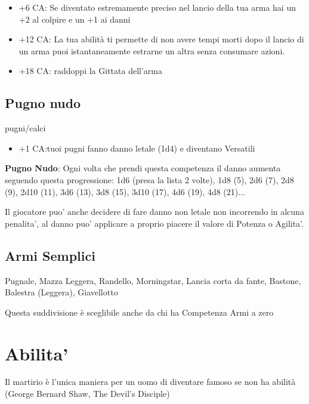 \documentclass[a4paper,11pt,twoside,openany]{book}
\begin{document}
\begin{itemize}
	\item +6 CA: Se diventato estremamente preciso nel lancio della tua arma hai un +2 al colpire e un +1 ai danni

	\item +12 CA: La tua abilità ti permette di non avere tempi morti dopo il lancio di un arma puoi istantaneamente estrarne un altra senza consumare azioni.

	\item +18 CA: raddoppi la Gittata dell'arma
\end{itemize}

\subsection{Pugno nudo} pugni/calci

\begin{itemize}
	\item +1 CA:tuoi pugni fanno danno letale (1d4) e diventano Versatili
\end{itemize}

\textbf{Pugno Nudo}: Ogni volta che prendi questa competenza il danno aumenta seguendo questa progressione: 1d6 (presa la lista 2 volte), 1d8 (5), 2d6 (7), 2d8 (9), 2d10 (11), 3d6 (13), 3d8 (15), 3d10 (17), 4d6 (19), 4d8 (21)...

Il giocatore puo' anche decidere di fare danno non letale non incorrendo in alcuna penalita', al danno puo' applicare a proprio piacere il valore di Potenza o Agilita'.

\subsection{Armi Semplici} Pugnale, Mazza Leggera, Randello, Morningstar, Lancia corta da fante, Bastone, Balestra (Leggera), Giavellotto

Questa suddivisione è sceglibile anche da chi ha Competenza Armi a zero

\pagebreak

\section{Abilita'}

\label{abilita}
\begin{tcolorbox}[enhanced,arc=5pt,boxrule=0.3pt]{Il martirio è l'unica maniera per un uomo di diventare famoso se non ha abilità (George Bernard Shaw, The Devil's Disciple)} \end{tcolorbox}\medskip
\end{document}
